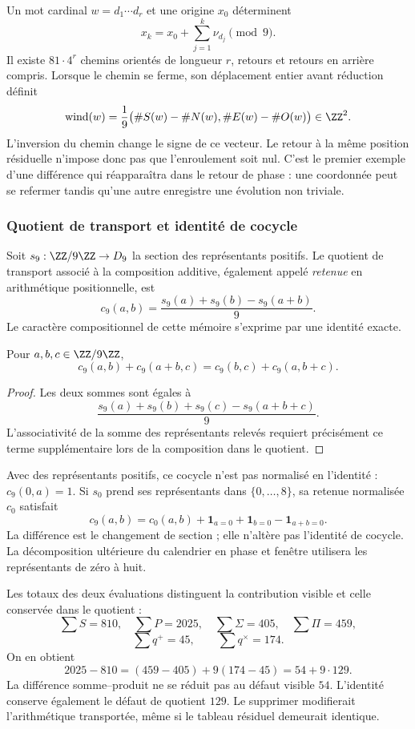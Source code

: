 Un mot cardinal \(w=d_1\cdots d_r\) et une origine \(x_0\) déterminent
\[
 x_k=x_0+\sum_{j=1}^k\nu_{d_j}\pmod9.
\]
Il existe \(81\cdot4^r\) chemins orientés de longueur \(r\), retours et retours en arrière compris. Lorsque le chemin se ferme, son déplacement entier avant réduction définit
\begin{equation}
 \operatorname{wind}(w)=\frac19
 \bigl(\#S(w)-\#N(w),\#E(w)-\#O(w)\bigr)\in\ZZ^2.
\end{equation}
L'inversion du chemin change le signe de ce vecteur. Le retour à la même position résiduelle n'impose donc pas que l'enroulement soit nul. C'est le premier exemple d'une différence qui réapparaîtra dans le retour de phase : une coordonnée peut se refermer tandis qu'une autre enregistre une évolution non triviale.

\subsubsection{Quotient de transport et identité de cocycle}

Soit \(s_9:\ZZ/9\ZZ\to D_9\) la section des représentants positifs. Le quotient de transport associé à la composition additive, également appelé \emph{retenue} en arithmétique positionnelle, est
\[
 c_9(a,b)=\frac{s_9(a)+s_9(b)-s_9(a+b)}9.
\]
Le caractère compositionnel de cette mémoire s'exprime par une identité exacte.

\begin{lemma}
Pour \(a,b,c\in\ZZ/9\ZZ\),
\[
 c_9(a,b)+c_9(a+b,c)=c_9(b,c)+c_9(a,b+c).
\]
\end{lemma}
\begin{proof}
Les deux sommes sont égales à
\[
 \frac{s_9(a)+s_9(b)+s_9(c)-s_9(a+b+c)}9.
\]
L'associativité de la somme des représentants relevés requiert précisément ce terme supplémentaire lors de la composition dans le quotient.
\end{proof}

Avec des représentants positifs, ce cocycle n'est pas normalisé en l'identité : \(c_9(0,a)=1\). Si \(s_0\) prend ses représentants dans \(\{0,\ldots,8\}\), sa retenue normalisée \(c_0\) satisfait
\[
 c_9(a,b)=c_0(a,b)+\mathbf1_{a=0}+\mathbf1_{b=0}-\mathbf1_{a+b=0}.
\]
La différence est le changement de section ; elle n'altère pas l'identité de cocycle. La décomposition ultérieure du calendrier en phase et fenêtre utilisera les représentants de zéro à huit.

Les totaux des deux évaluations distinguent la contribution visible et celle conservée dans le quotient :
\[
 \sum S=810,\quad\sum P=2025,\quad
 \sum\Sigma=405,\quad\sum\Pi=459,
\]
\[
 \sum q^+=45,\qquad\sum q^\times=174.
\]
On en obtient
\begin{equation}
 2025-810=(459-405)+9(174-45)=54+9\cdot129.
 \label{eq:defecto-integrado}
\end{equation}
La différence somme--produit ne se réduit pas au défaut visible \(54\). L'identité conserve également le défaut de quotient \(129\). Le supprimer modifierait l'arithmétique transportée, même si le tableau résiduel demeurait identique.

